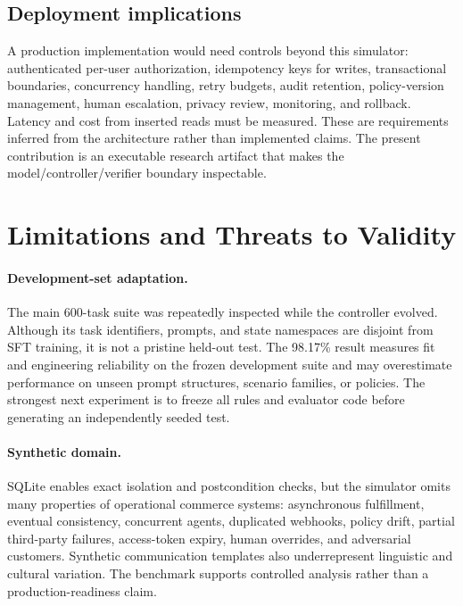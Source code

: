 \documentclass[11pt]{article}
\begin{document}
\subsection{Deployment implications}

A production implementation would need controls beyond this simulator: authenticated per-user authorization, idempotency keys for writes, transactional boundaries, concurrency handling, retry budgets, audit retention, policy-version management, human escalation, privacy review, monitoring, and rollback. Latency and cost from inserted reads must be measured. These are requirements inferred from the architecture rather than implemented claims. The present contribution is an executable research artifact that makes the model/controller/verifier boundary inspectable.

\section{Limitations and Threats to Validity}
\label{sec:limitations}

\paragraph{Development-set adaptation.}
The main 600-task suite was repeatedly inspected while the controller evolved. Although its task identifiers, prompts, and state namespaces are disjoint from SFT training, it is not a pristine held-out test. The 98.17\% result measures fit and engineering reliability on the frozen development suite and may overestimate performance on unseen prompt structures, scenario families, or policies. The strongest next experiment is to freeze all rules and evaluator code before generating an independently seeded test.

\paragraph{Synthetic domain.}
SQLite enables exact isolation and postcondition checks, but the simulator omits many properties of operational commerce systems: asynchronous fulfillment, eventual consistency, concurrent agents, duplicated webhooks, policy drift, partial third-party failures, access-token expiry, human overrides, and adversarial customers. Synthetic communication templates also underrepresent linguistic and cultural variation. The benchmark supports controlled analysis rather than a production-readiness claim.
\end{document}
